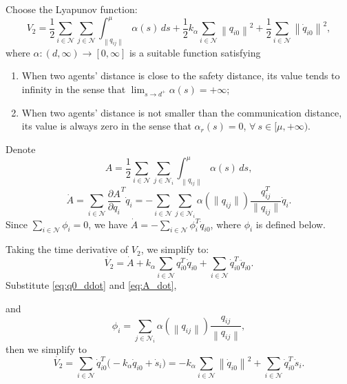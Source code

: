 Choose the Lyapunov function:
\begin{equation*}\label{eq:V2}
	V_2 = \frac{1}{2} \sum_{i\in\mathcal{N}}\sum_{j\in\mathcal{N}}
	\int_{\left\| q_{ij} \right\|}^{\mu}
	\alpha(s)\,ds
	+ \frac{1}{2}k_{\alpha}\sum_{i\in\mathcal{N}}
	\left\| q_{i0} \right\|^2
	+ \frac{1}{2}\sum_{i\in\mathcal{N}}
	\left\| \dot{q}_{i0} \right\|^{2},
\end{equation*}
where $\alpha:(d,\infty) \rightarrow [0,\infty]$ is a suitable function satisfying
\begin{enumerate}
	\item[B1.] When two agents' distance is close to the safety distance, its value tends to infinity  in the sense that  $\lim_{s \to d^+} \alpha(s) = +\infty$;
	\item[B2.] When two agents' distance is not smaller than the communication distance, its value is always zero in the sense that $\alpha_r(s)=0$, $\forall ~ s \in [\mu,+\infty).$
\end{enumerate}

Denote
\begin{equation*}\label{eq:A}
	A=\frac{1}{2} \sum_{i\in\mathcal{N}}\sum_{j\in\mathcal{N}_i}
	\int_{\left\| q_{ij} \right\|}^{\mu}
	\alpha(s)\,ds,
\end{equation*}
\begin{equation}\label{eq:A_dot}
	\dot{A} = \sum_{i\in\mathcal{N}} \frac{\partial A}{\partial q_i}^T \dot{q}_i
    	= -\sum_{i\in\mathcal{N}} \sum_{j\in\mathcal{N}_i} \alpha(\|q_{ij}\|)\frac{q_{ij}^T}{\|q_{ij}\|}\dot{q}_i.
\end{equation}
Since $\sum_{i\in\mathcal{N}}\phi_i = 0$, we have $\dot{A} = -\sum_{i\in\mathcal{N}} \phi_i^T \dot{q}_{i0}$, where $\phi_i$ is defined below.

Taking the time derivative of \( V_2 \), we simplify to:
\begin{equation*}\label{eq:V2_dot}
	\dot{V_2} = \dot{A}+k_{\alpha}\sum_{i\in\mathcal{N}}
	q_{i0}^T\dot{q}_{i0}+\sum_{i\in\mathcal{N}}
	\dot{q}_{i0}^T\ddot{q}_{i0}.  
\end{equation*}
Substitute \eqref{eq:q0_ddot} and \eqref{eq:A_dot},

and
\begin{equation*}\label{eq:phi_i}
	\phi_i= \sum_{j\in\mathcal{N}_i}{\alpha}({\left\| q_{ij} \right\|})\frac{q_{ij}}{\left\| q_{ij} \right\|},
\end{equation*}
then we simplify to
\begin{equation*}\label{eq:V2_dot_final}
	\dot{V_2} =\sum_{i\in\mathcal{N}}\dot{q}_{i0}^T\bigl(-k_\alpha \dot{q}_{i0} + \dot{s}_i\bigr)
	=-k_\alpha\sum_{i\in\mathcal{N}}\left\| \dot{q}_{i0} \right\|^2+\sum_{i\in\mathcal{N}}\dot{q}_{i0}^T\dot{s}_i.
\end{equation*}

